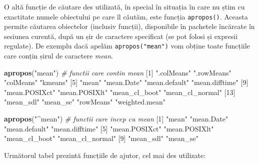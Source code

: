\documentclass[]{article}
\newenvironment{Shaded}{\begin{snugshade}}{\end{snugshade}}
\newcommand{\KeywordTok}[1]{\textcolor[rgb]{0.13,0.29,0.53}{\textbf{#1}}}
\newcommand{\DecValTok}[1]{\textcolor[rgb]{0.00,0.00,0.81}{#1}}
\newcommand{\StringTok}[1]{\textcolor[rgb]{0.31,0.60,0.02}{#1}}
\newcommand{\CommentTok}[1]{\textcolor[rgb]{0.56,0.35,0.01}{\textit{#1}}}
\newcommand{\NormalTok}[1]{#1}
\begin{document}
O altă funcție de căutare des utilizată, în special în situația în care
nu știm cu exactitate numele obiectului pe care îl căutăm, este funcția
\texttt{apropos()}. Aceasta permite căutarea obiectelor (inclusiv
funcții), disponibile în pachetele încărcate în sesiunea curentă, după
un șir de caractere specificat (se pot folosi și expresii regulate). De
exemplu dacă apelăm \texttt{apropos("mean")} vom obține toate funcțiile
care conțin șirul de caractere \emph{mean}.

\begin{Shaded}
\begin{Highlighting}[]
\KeywordTok{apropos}\NormalTok{(}\StringTok{"mean"}\NormalTok{) }\CommentTok{# functii care contin mean}
\NormalTok{ [}\DecValTok{1}\NormalTok{] }\StringTok{".colMeans"}      \StringTok{".rowMeans"}      \StringTok{"colMeans"}       \StringTok{"kmeans"}        
\NormalTok{ [}\DecValTok{5}\NormalTok{] }\StringTok{"mean"}           \StringTok{"mean.Date"}      \StringTok{"mean.default"}   \StringTok{"mean.difftime"} 
\NormalTok{ [}\DecValTok{9}\NormalTok{] }\StringTok{"mean.POSIXct"}   \StringTok{"mean.POSIXlt"}   \StringTok{"mean_cl_boot"}   \StringTok{"mean_cl_normal"}
\NormalTok{[}\DecValTok{13}\NormalTok{] }\StringTok{"mean_sdl"}       \StringTok{"mean_se"}        \StringTok{"rowMeans"}       \StringTok{"weighted.mean"} 

\KeywordTok{apropos}\NormalTok{(}\StringTok{"^mean"}\NormalTok{) }\CommentTok{# functii care incep cu mean}
\NormalTok{ [}\DecValTok{1}\NormalTok{] }\StringTok{"mean"}           \StringTok{"mean.Date"}      \StringTok{"mean.default"}   \StringTok{"mean.difftime"} 
\NormalTok{ [}\DecValTok{5}\NormalTok{] }\StringTok{"mean.POSIXct"}   \StringTok{"mean.POSIXlt"}   \StringTok{"mean_cl_boot"}   \StringTok{"mean_cl_normal"}
\NormalTok{ [}\DecValTok{9}\NormalTok{] }\StringTok{"mean_sdl"}       \StringTok{"mean_se"}       
\end{Highlighting}
\end{Shaded}

Următorul tabel prezintă funcțiile de ajutor, cel mai des utilizate:
\end{document}
